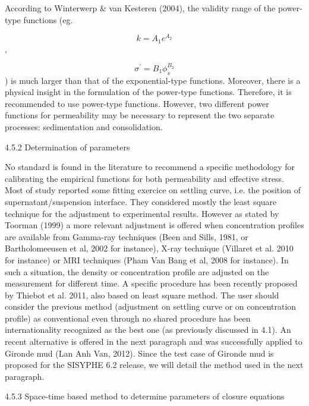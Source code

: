 According to Winterwerp \& van Kesteren (2004), the validity range of the
power-type functions (eg.

\begin{equation*}
k=A_{1} e^{A_{2} } 
\end{equation*}%
,

\begin{equation*}
\sigma ^{\prime }=B_{1} \phi _{s}^{B_{2} } 
\end{equation*}%
) is much larger than that of the exponential-type functions. Moreover,
there is a physical insight in the formulation of the power-type functions.
Therefore, it is recommended to use power-type functions. However, two
different power functions for permeability may be necessary to represent the
two separate processes: sedimentation and consolidation.

4.5.2 Determination of parameters

No standard is found in the literature to recommend a specific methodology
for calibrating the empirical functions for both permeability and effective
stress. Most of study reported some fitting exercice on settling curve, i.e.
the position of supernatant/suspension interface. They considered mostly the
least square technique for the adjustment to experimental results. However
as stated by Toorman (1999) a more relevant adjustment is offered when
concentration profiles are available from Gamma-ray techniques (Been and
Sills, 1981, or Bartholomeeusen et al, 2002 for instance), X-ray technique
(Villaret et al. 2010 for instance) or MRI techniques (Pham Van Bang et al,
2008 for instance). In such a situation, the density or concentration
profile are adjusted on the measurement for different time. A specific
procedure has been recently proposed by Thiebot et al. 2011, also based on
least square method.\newline
The user should consider the previous method (adjustment on settling curve
or on concentration profile) as conventional even through no shared
procedure has been internationality recognized as the best one (as
previously discussed in 4.1).\newline
An recent alternative is offered in the next paragraph and was successfully
applied to Gironde mud (Lan Anh Van, 2012). Since the test case of Gironde
mud is proposed for the SISYPHE 6.2 release, we will detail the method used
in the next paragraph.

4.5.3 Space-time based method to determine parameters of closure equations

